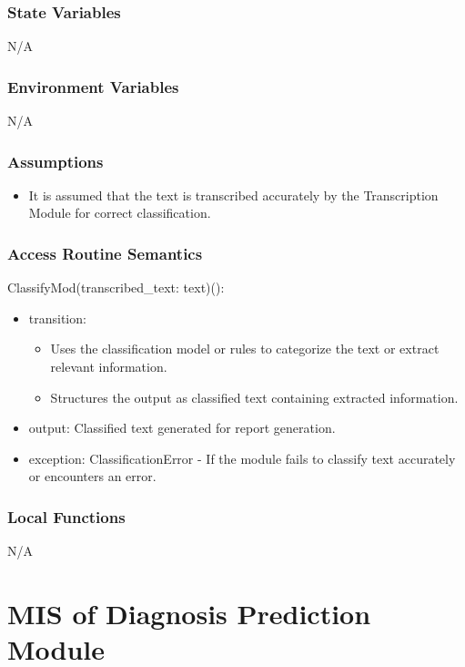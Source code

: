 \documentclass[12pt, titlepage]{article}
\begin{document}
\subsubsection{State Variables}

N/A

\subsubsection{Environment Variables}

N/A

\subsubsection{Assumptions}

\begin{itemize}
  \item It is assumed that the text is transcribed accurately by the Transcription Module for correct classification.
\end{itemize}

\subsubsection{Access Routine Semantics}

\noindent ClassifyMod(transcribed_text: text)():
\begin{itemize}
\item transition:
\begin{itemize}
  \item Uses the classification model or rules to categorize the text or extract relevant information.
  \item Structures the output as classified text containing extracted information.
\end{itemize} 
\item output: Classified text generated for report generation. 
\item exception: ClassificationError - If the module fails to classify text accurately or encounters an error. 
\end{itemize}

\subsubsection{Local Functions}

N/A

\newpage

\section{MIS of Diagnosis Prediction Module} \label{diag_pred_mod}
\end{document}
